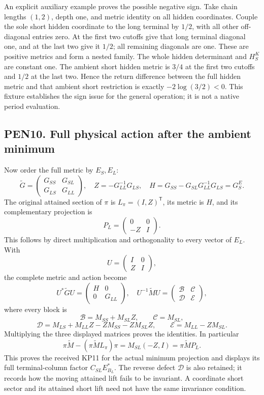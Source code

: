 \documentclass[11pt]{article}
\begin{document}
An explicit auxiliary example proves the possible negative sign. Take chain lengths \((1,2)\), depth one, and metric identity on all hidden coordinates. Couple the sole short hidden coordinate to the long terminal by \(1/2\), with all other off-diagonal entries zero. At the first two cutoffs give that long terminal diagonal one, and at the last two give it \(1/2\); all remaining diagonals are one. These are positive metrics and form a nested family. The whole hidden determinant and \(H_S^K\) are constant one. The ambient short hidden metric is \(3/4\) at the first two cutoffs and \(1/2\) at the last two. Hence the return difference between the full hidden metric and that ambient short restriction is exactly \(-2\log(3/2)<0\). This fixture establishes the sign issue for the general operation; it is not a native period evaluation.

\subsection{PEN10. Full physical action after the ambient minimum}\label{pen10.-full-physical-action-after-the-ambient-minimum}

Now order the full metric by \(E_S,E_L\): \[
\widetilde G=\begin{pmatrix}G_{SS}&G_{SL}\\G_{LS}&G_{LL}\end{pmatrix},\quad
Z=-G_{LL}^{-1}G_{LS},\quad
H=G_{SS}-G_{SL}G_{LL}^{-1}G_{LS}=G_S^E.
\] The original attained section of \(\pi\) is \(L_\pi=(I,Z)^{\mathsf T}\), its metric is \(H\), and its complementary projection is \[
P_L=\begin{pmatrix}0&0\\-Z&I\end{pmatrix}.
\] This follows by direct multiplication and orthogonality to every vector of \(E_L\). With \[
U=\begin{pmatrix}I&0\\Z&I\end{pmatrix},
\] the complete metric and action become \[
U^*\widetilde G U=\begin{pmatrix}H&0\\0&G_{LL}\end{pmatrix},
\quad
U^{-1}\widetilde M U=
\begin{pmatrix}\mathcal B&\mathcal C\\\mathcal D&\mathcal E\end{pmatrix}, \tag{PEN21}
\] where every block is \[
\mathcal B=M_{SS}+M_{SL}Z,\qquad \mathcal C=M_{SL},
\] \[
\mathcal D=M_{LS}+M_{LL}Z-ZM_{SS}-ZM_{SL}Z,\qquad
\mathcal E=M_{LL}-ZM_{SL}. \tag{PEN22}
\] Multiplying the three displayed matrices proves the identities. In particular \[
\pi\widetilde M-(\pi\widetilde M L_\pi)\pi=M_{SL}(-Z,I)
=\pi\widetilde M P_L. \tag{PEN23}
\] This proves the received KP11 for the actual minimum projection and displays its full terminal-column factor \(C_{SL}E_{B_L}^*\). The reverse defect \(\mathcal D\) is also retained; it records how the moving attained lift fails to be invariant. A coordinate short sector and its attained short lift need not have the same invariance condition.
\end{document}
